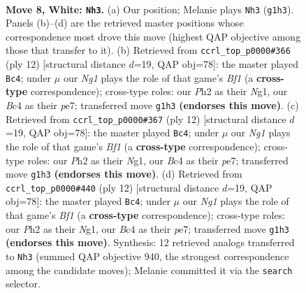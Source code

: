 \documentclass[11pt]{article}
\begin{document}
\begin{figure}[p]\centering
\begin{subfigure}{0.46\textwidth}\centering
\resizebox{\linewidth}{!}{%
\newchessgame
\chessboard[
  setfen={rnbqk2r/ppp1pp1p/5bp1/8/2BPP3/2P5/P4PPP/R1BQK1NR w KQkq - 3 8},
  showmover=false,
  pgfstyle=straightmove, color=movearrow, markmove={g1-h3}
]}
\caption{}
\end{subfigure}\hfill
\begin{subfigure}{0.46\textwidth}\centering
\resizebox{\linewidth}{!}{%
\newchessgame
\chessboard[
  setfen={rnbqk2r/ppp1ppbp/6p1/8/3PP3/2P5/P4PPP/R1BQKBNR w KQkq - 1 7},
  showmover=false,
  pgfstyle=straightmove, color=movearrow, markmove={f1-c4}
]}
\caption{}
\end{subfigure}
\\[4pt]
\begin{subfigure}{0.46\textwidth}\centering
\resizebox{\linewidth}{!}{%
\newchessgame
\chessboard[
  setfen={rnbqk2r/ppp1ppbp/6p1/8/3PP3/2P5/P4PPP/R1BQKBNR w KQkq - 1 7},
  showmover=false,
  pgfstyle=straightmove, color=movearrow, markmove={f1-c4}
]}
\caption{}
\end{subfigure}\hfill
\begin{subfigure}{0.46\textwidth}\centering
\resizebox{\linewidth}{!}{%
\newchessgame
\chessboard[
  setfen={rnbqk2r/ppp1ppbp/6p1/8/3PP3/2P5/P4PPP/R1BQKBNR w KQkq - 1 7},
  showmover=false,
  pgfstyle=straightmove, color=movearrow, markmove={f1-c4}
]}
\caption{}
\end{subfigure}
\caption{\textbf{Move 8, White: \texttt{Nh3}.} (a) Our position; Melanie plays \texttt{Nh3} (\texttt{g1h3}). Panels (b)--(d) are the retrieved master positions whose correspondence most drove this move (highest QAP objective among those that transfer to it). (b) Retrieved from \texttt{ccrl\_top\_p0000\#366} (ply 12) [structural distance $d$=19, QAP obj=78]: the master played \texttt{Bc4}; under $\mu$ our \emph{Ng1} plays the role of that game's \emph{Bf1} (a \textbf{cross-type} correspondence); cross-type roles: our \emph{P}h2 as their \emph{N}g1, our \emph{B}c4 as their \emph{p}e7; transferred move \texttt{g1h3} \textbf{(endorses this move)}. (c) Retrieved from \texttt{ccrl\_top\_p0000\#367} (ply 12) [structural distance $d$=19, QAP obj=78]: the master played \texttt{Bc4}; under $\mu$ our \emph{Ng1} plays the role of that game's \emph{Bf1} (a \textbf{cross-type} correspondence); cross-type roles: our \emph{P}h2 as their \emph{N}g1, our \emph{B}c4 as their \emph{p}e7; transferred move \texttt{g1h3} \textbf{(endorses this move)}. (d) Retrieved from \texttt{ccrl\_top\_p0000\#440} (ply 12) [structural distance $d$=19, QAP obj=78]: the master played \texttt{Bc4}; under $\mu$ our \emph{Ng1} plays the role of that game's \emph{Bf1} (a \textbf{cross-type} correspondence); cross-type roles: our \emph{P}h2 as their \emph{N}g1, our \emph{B}c4 as their \emph{p}e7; transferred move \texttt{g1h3} \textbf{(endorses this move)}. Synthesis: 12 retrieved analogs transferred to \texttt{Nh3} (summed QAP objective 940, the strongest correspondence among the candidate moves); Melanie committed it via the \texttt{search} selector.}
\label{fig:thought-m14}
\end{figure}
\end{document}
